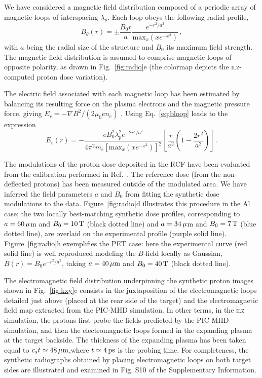 \documentclass[aps,twocolumn,showpacs,superscriptaddress]{revtex4}
\begin{document}
We have considered a magnetic field distribution composed of a periodic array of magnetic loops of interspacing $\lambda_p$. Each loop obeys the following radial profile,
\begin{equation}\label{eq:bloop}
B_\theta(r)  = \pm \frac{B_0 r}{a} \frac{ e^{-r^2/a^2} }{\mathrm{max}_x(xe^{-x^2})} \,,
\end{equation} %
with $a$ being the radial size of the structure and $B_0$ its maximum field strength. The magnetic field distribution is assumed to comprise magnetic loops of opposite polarity, as drawn in Fig.~\ref{fig:radio}e (the colormap depicts the \textsc{ilz}-computed proton dose variation). 

The electric field associated with each magnetic loop has been estimated by balancing its resulting force on the plasma electrons and the magnetic pressure force, giving $E_r = -\nabla B^2 /(2\mu_0e n_e)$ \cite{POP_Dieckmann_2009, POP_Bret_Gremillet_2010}. Using Eq.~\eqref{eq:bloop} leads to the expression
\begin{equation}\label{eq:eloop}
E_r(r) = -\frac{  eB_0^2\lambda_p^2   e^{-2r^2/a^2}}{4\pi^2 m_e [\mathrm{max}_x(xe^{-x^2})]^2} \left[ \frac{r}{a^2}\left( 1-\frac{2r^2}{a^2}\right)  \right]  \,.
\end{equation} 

The modulations of the proton dose deposited in the RCF have been evaluated from the calibration performed in Ref.~\cite{RSI_Chen_2016}. The reference dose (from the non-deflected protons) has been measured outside of the modulated area. We have inferred the field parameters $a$ and $B_0$ from fitting the synthetic dose modulations to the data. Figure~\ref{fig:radio}d illustrates this procedure in the Al case: the two locally best-matching synthetic dose profiles, corresponding to $a=60\,\rm \mu$m and $B_0=10\,\rm T$ (black dotted line) and $a=34\,\rm \mu$m and $B_0=7\,\rm T$ (blue dotted line), are overlaid on the experimental profile (purple solid line). Figure~\ref{fig:radio}h exemplifies the PET case: here the experimental curve (red solid line) is well reproduced modeling the $B$-field locally as Gaussian, $B(r) = B_0 e^{-r^2/a^2}$, taking $a=40\, \rm \mu m$ and $B_0 = 40\,\rm T$ (black dotted line).

The electromagnetic field distribution underpinning the synthetic proton images shown in Fig.~\ref{fig:kxy}c consists in the juxtaposition of the electromagnetic loops detailed just above (placed at the rear side of the target) and the electromagnetic field map extracted from the PIC-MHD simulation. In other terms, in the \textsc{ilz} simulation, the protons first probe the fields predicted by the PIC-MHD simulation, and then the electromagnetic loops formed in the expanding plasma at the target backside.
The thickness of the expanding plasma has been taken equal to $c_s t \simeq 48\,\rm \mu m$,where $t\simeq 4\, \rm ps$ is the probing time. For completeness, the synthetic radiographs obtained by placing electromagnetic loops on both target sides are illustrated and examined in Fig. S10 of the Supplementary Information. 
\end{document}

